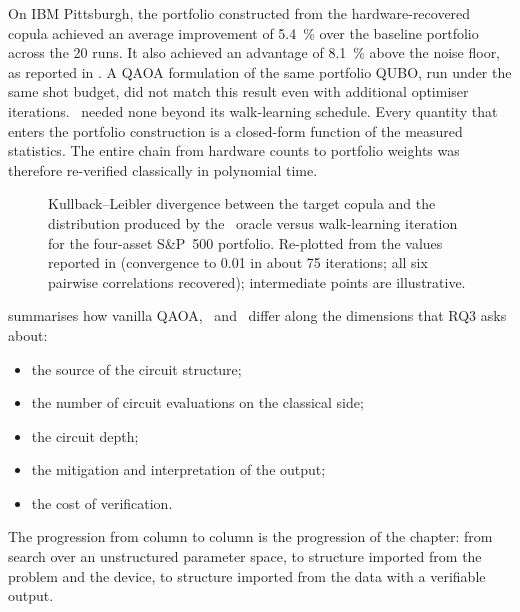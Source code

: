 On IBM Pittsburgh, the portfolio constructed from the hardware-recovered copula achieved an average improvement of \SI{5.4}{\percent} over the baseline portfolio across the 20 runs. It also achieved an advantage of \SI{8.1}{\percent} above the noise floor, as reported in \cite{guo2025qawa}. A QAOA formulation of the same portfolio QUBO, run under the same shot budget, did not match this result even with additional optimiser iterations. \qawa\ needed none beyond its walk-learning schedule. Every quantity that enters the portfolio construction is a closed-form function of the measured statistics. The entire chain from hardware counts to portfolio weights was therefore re-verified classically in polynomial time.

\begin{figure}[htbp]
\centering
{}
\caption{Kullback--Leibler divergence between the target copula and the distribution produced by the \qawa\ oracle versus walk-learning iteration for the four-asset S\&P~500 portfolio. Re-plotted from the values reported in \cite{guo2025qawa} (convergence to 0.01 in about 75 iterations; all six pairwise correlations recovered); intermediate points are illustrative.}
\label{fig:nisq:qawa-kl}
\end{figure}

 summarises how vanilla QAOA, \deal\ and \qawa\ differ along the dimensions that RQ3 asks about:
\begin{itemize}
\item the source of the circuit structure;
\item the number of circuit evaluations on the classical side;
\item the circuit depth;
\item the mitigation and interpretation of the output;
\item the cost of verification.
\end{itemize}
The progression from column to column is the progression of the chapter: from search over an unstructured parameter space, to structure imported from the problem and the device, to structure imported from the data with a verifiable output.

